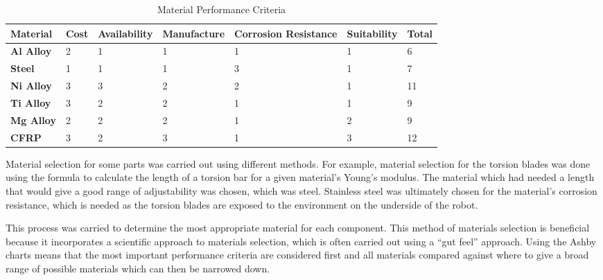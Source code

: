 \begin{table}[]
\centering
\caption{Material Performance Criteria}
\label{CriteriaTable}
\begin{tabular}{|l|l|l|l|l|l|l|}
\hline
\textbf{Material} & \textbf{Cost} & \textbf{Availability} & \textbf{Manufacture} & \textbf{Corrosion Resistance} & \textbf{Suitability} & \textbf{Total} \\ \hline
\textbf{Al Alloy} &2&1&1&1&1&6\\ \hline
\textbf{Steel} &1&1&1&3&1&7\\ \hline
\textbf{Ni Alloy} &3&3&2&2&1&11\\ \hline
\textbf{Ti Alloy} &3&2&2&1&1&9\\ \hline
\textbf{Mg Alloy} &2&2&2&1&2&9\\ \hline
\textbf{CFRP} &3&2&3&1&3&12\\ \hline
\end{tabular}
\end{table}
\par
Material selection for some parts was carried out using different methods. For example, material selection for the torsion blades was done using the formula to calculate the length of a torsion bar for a given material's Young’s modulus. The material which had needed a length that would give a good range of adjustability was chosen, which was steel. Stainless steel was ultimately chosen for the material’s corrosion resistance, which is needed as the torsion blades are exposed to the environment on the underside of the robot.

This process was carried to determine the most appropriate material for each component. This method of materials selection is beneficial because it incorporates a scientific approach to materials selection, which is often carried out using a “gut feel” approach. Using the Ashby charts means that the most important performance criteria are considered first and all materials compared against where to give a broad range of possible materials which can then be narrowed down.
